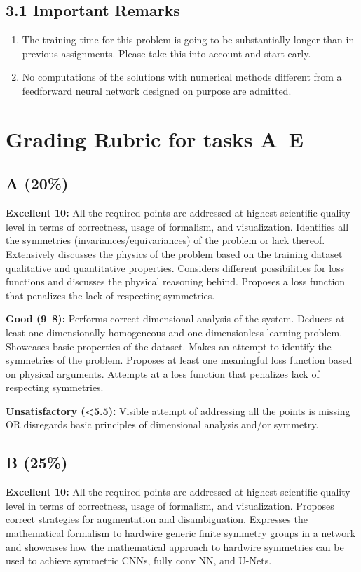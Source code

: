 \documentclass[11pt,a4paper]{article}
\begin{document}
\subsection*{3.1 Important Remarks}
\begin{enumerate}
    \item The training time for this problem is going to be substantially longer than in previous assignments. Please take this into account and start early.
    \item No computations of the solutions with numerical methods different from a feedforward neural network designed on purpose are admitted.
\end{enumerate}

\section*{Grading Rubric for tasks A--E}

\subsection*{A (20\%)}
\textbf{Excellent 10:} All the required points are addressed at highest scientific quality level in terms of correctness, usage of formalism, and visualization. Identifies all the symmetries (invariances/equivariances) of the problem or lack thereof. Extensively discusses the physics of the problem based on the training dataset qualitative and quantitative properties. Considers different possibilities for loss functions and discusses the physical reasoning behind. Proposes a loss function that penalizes the lack of respecting symmetries.

\textbf{Good (9--8):} Performs correct dimensional analysis of the system. Deduces at least one dimensionally homogeneous and one dimensionless learning problem. Showcases basic properties of the dataset. Makes an attempt to identify the symmetries of the problem. Proposes at least one meaningful loss function based on physical arguments. Attempts at a loss function that penalizes lack of respecting symmetries.

\textbf{Unsatisfactory (<5.5):} Visible attempt of addressing all the points is missing OR disregards basic principles of dimensional analysis and/or symmetry.

\subsection*{B (25\%)}
\textbf{Excellent 10:} All the required points are addressed at highest scientific quality level in terms of correctness, usage of formalism, and visualization. Proposes correct strategies for augmentation and disambiguation. Expresses the mathematical formalism to hardwire generic finite symmetry groups in a network and showcases how the mathematical approach to hardwire symmetries can be used to achieve symmetric CNNs, fully conv NN, and U-Nets.
\end{document}
